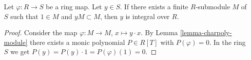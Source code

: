 \begin{lemma}
\label{lemma-characterize-integral-element}
Let $\varphi : R \to S$ be a ring map. Let $y \in S$. If there exists a
finite $R$-submodule $M$ of $S$ such that $1 \in M$ and $yM \subset M$,
then $y$ is integral over $R$.
\end{lemma}

\begin{proof}
Consider the map $\varphi : M \to M$, $x \mapsto y \cdot x$.
By Lemma \ref{lemma-charpoly-module} there exists a monic polynomial
$P \in R[T]$ with $P(\varphi) = 0$. In the ring $S$ we get
$P(y) = P(y) \cdot 1 = P(\varphi)(1) = 0$.
\end{proof}
